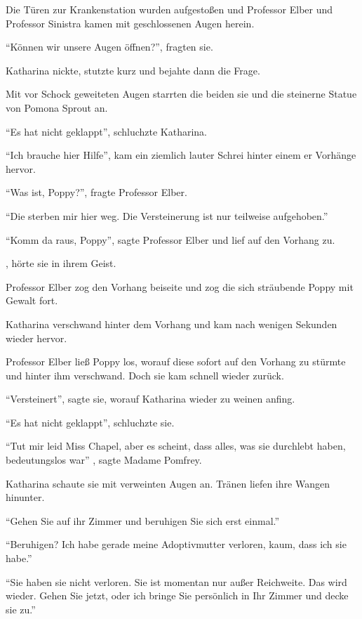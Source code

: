 Die Türen zur Krankenstation wurden aufgestoßen und Professor Elber und Professor Sinistra kamen mit geschlossenen Augen herein.

\enquote{Können wir unsere Augen öffnen?}, fragten sie.

Katharina nickte, stutzte kurz und bejahte dann die Frage.

Mit vor Schock geweiteten Augen starrten die beiden sie und die steinerne Statue von Pomona Sprout an.

\enquote{Es hat nicht geklappt}, schluchzte Katharina.

\enquote{Ich brauche hier Hilfe}, kam ein ziemlich lauter Schrei hinter einem er Vorhänge hervor.

\enquote{Was ist, Poppy?}, fragte Professor Elber.

\enquote{Die sterben mir hier weg. Die Versteinerung ist nur teilweise aufgehoben.}

\enquote{Komm da raus, Poppy}, sagte Professor Elber und lief auf den Vorhang zu.

, hörte sie in ihrem Geist.

Professor Elber zog den Vorhang beiseite und zog die sich sträubende Poppy mit Gewalt fort.

Katharina verschwand hinter dem Vorhang und kam nach wenigen Sekunden wieder hervor.

Professor Elber ließ Poppy los, worauf diese sofort auf den Vorhang zu stürmte und hinter ihm verschwand. Doch sie kam schnell wieder zurück.

\enquote{Versteinert}, sagte sie, worauf Katharina wieder zu weinen anfing.

\enquote{Es hat nicht geklappt}, schluchzte sie.

\enquote{Tut mir leid Miss Chapel, aber es scheint, dass alles, was sie durchlebt haben, bedeutungslos war} , sagte Madame Pomfrey.

Katharina schaute sie mit verweinten Augen an. Tränen liefen ihre Wangen hinunter.

\enquote{Gehen Sie auf ihr Zimmer und beruhigen Sie sich erst einmal.}

\enquote{Beruhigen? Ich habe gerade meine Adoptivmutter verloren, kaum, dass ich sie habe.}

\enquote{Sie haben sie nicht verloren. Sie ist momentan nur außer Reichweite. Das wird wieder. Gehen Sie jetzt, oder ich bringe Sie persönlich in Ihr Zimmer und decke sie zu.}

